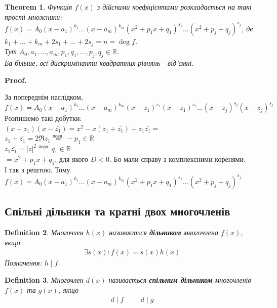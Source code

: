 \documentclass[a4paper, 10pt]{extarticle}
\makeatletter
\def\qed{$\blacksquare$}
\def\qed{$\blacksquare$}
\theoremstyle{theoremdd}
\newtheorem{theorem}{Theorem}[subsection]
\theoremstyle{theoremdd}
\newtheorem{definition}[theorem]{Definition}
\theoremstyle{theoremdd}
\theoremstyle{theoremdd}
\theoremstyle{theoremdd}
\theoremstyle{theoremdd}
\theoremstyle{theoremdd}
\theoremstyle{theoremdd}
\renewenvironment{proof}[1][Proof.\\]{\par
\pushQED{\hfill \qed}%
\normalfont \topsep6\p@\@plus6\p@\relax
\trivlist
\item\relax
{\bfseries
#1\@addpunct{.}}\hspace\labelsep\ignorespaces
}{%
\popQED\endtrivlist\@endpefalse
}
\makeatother
\begin{document}
\begin{theorem}
Функція $f(x)$ з дійсними коефіцієнтами розкладається на такі прості множники:\\
$f(x) = A_0 (x-a_1)^{k_1} \dots (x-a_m)^{k_m} (x^2+p_1x+q_1)^{s_1} \dots (x^2+p_j+q_j)^{s_j}$, де \\
$k_1 + \dots + k_m + 2s_1 + \dots + 2s_j = n = \deg f$.\\
Тут $A_0, a_1,\dots,a_m, p_1,q_1,\dots,p_j,q_j \in \mathbb{R}$.\\
Ба більше, всі дискримінанти квадратних рівнянь - від'ємні.
\end{theorem}

\begin{proof}
За попереднім наслідком,\\
$f(x) = A_0(x-a_1)^{k_1} \dots (x-a_m)^{k_m} (x-z_1)^{s_1} (x-\bar{z_1})^{s_1} \dots (x-z_j)^{s_j} (x-\bar{z_j})^{s_j}$\\
Розпишемо такі добутки:\\
$(x-z_1)(x-\bar{z_1}) = x^2 - x(z_1 +\bar{z_1}) + z_1 \bar{z_1} \boxed{=}$\\
$z_1 + \bar{z_1} = 2 \Re z_1 \overset{\textrm{позн.}}{=} -p_1 \in \mathbb{R}$\\
$z_1 \bar{z_1} = |z|^2 \overset{\textrm{позн.}}{=} q_1 \in \mathbb{R}$\\
$\boxed{=} x^2 + p_1x + q_1$, для якого $D < 0$. Бо мали справу з комплексними коренями.\\
І так з рештою. Тому\\
$f(x) = A_0 (x-a_1)^{k_1} \dots (x-a_m)^{k_m} (x^2+p_1x+q_1)^{s_1} \dots (x^2+p_j+q_j)^{s_j}$
\end{proof}

\subsection{Спільні дільники та кратні двох многочленів}
\begin{definition}
Многочлен $h(x)$ називається \textbf{дільником} многочлена $f(x)$, якщо
\begin{align*}
\exists s(x): f(x) = s(x) h(x)
\end{align*}
Позначення: $h \mid f$.
\end{definition}

\begin{definition}
Многочлен $d(x)$ називається \textbf{спільним дільником} многочленів $f(x)$ та $g(x)$, якщо
\begin{align*}
d \mid f \hspace{1cm} d \mid g
\end{align*}
\end{definition}
\end{document}
